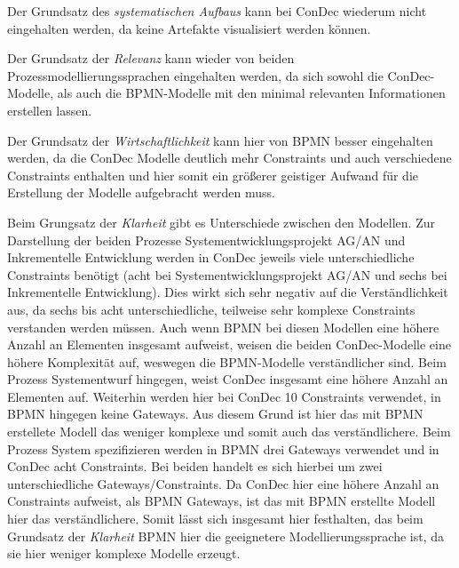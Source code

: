 Der  Grundsatz des \textit{systematischen Aufbaus} kann bei ConDec wiederum nicht eingehalten werden, da keine Artefakte visualisiert werden können.\newline

Der Grundsatz der \textit{Relevanz} kann wieder von beiden Prozessmodellierungssprachen eingehalten werden, da sich sowohl die ConDec-Modelle, als auch die BPMN-Modelle mit den minimal relevanten Informationen erstellen lassen.\newline

Der Grundsatz der \textit{Wirtschaftlichkeit} kann hier von BPMN besser eingehalten werden, da die ConDec Modelle deutlich mehr Constraints und auch verschiedene Constraints enthalten und hier somit ein größerer geistiger Aufwand für die Erstellung der Modelle aufgebracht werden muss.\newline

Beim Grungsatz der \textit{Klarheit} gibt es Unterschiede zwischen den Modellen. Zur Darstellung der beiden Prozesse Systementwicklungsprojekt AG/AN und Inkrementelle Entwicklung werden in ConDec jeweils viele unterschiedliche Constraints benötigt (acht bei Systementwicklungsprojekt AG/AN und sechs bei Inkrementelle Entwicklung). Dies wirkt sich sehr negativ auf die Verständlichkeit aus, da sechs bis acht unterschiedliche, teilweise sehr komplexe Constraints verstanden werden müssen. Auch wenn BPMN bei diesen Modellen eine höhere Anzahl an Elementen insgesamt aufweist, weisen die beiden ConDec-Modelle eine höhere Komplexität auf, weswegen die BPMN-Modelle verständlicher sind. \newline
Beim Prozess Systementwurf hingegen, weist ConDec  insgesamt eine höhere Anzahl an Elementen auf. Weiterhin werden hier bei ConDec 10 Constraints verwendet, in BPMN hingegen keine Gateways. Aus diesem Grund ist hier das mit BPMN erstellete Modell das weniger komplexe und somit auch das verständlichere.\newline
Beim Prozess System spezifizieren werden in BPMN drei Gateways verwendet und in ConDec acht Constraints. Bei beiden handelt es sich hierbei um zwei unterschiedliche Gateways/Constraints. Da ConDec hier eine höhere Anzahl an Constraints aufweist, als BPMN Gateways, ist das mit BPMN erstellte Modell hier das verständlichere. \newline
Somit lässt sich insgesamt hier festhalten, das beim Grundsatz der \textit{Klarheit} BPMN hier die geeignetere Modellierungssprache ist, da sie hier weniger komplexe Modelle erzeugt.\newline


